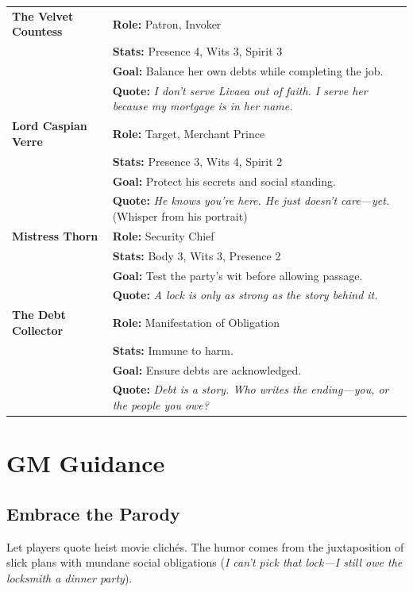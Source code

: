 \documentclass[12pt]{book}
\begin{document}
\begin{longtable}{p{} p{}}
\toprule
\textbf{The Velvet Countess} & \textbf{Role:} Patron, Invoker \\
& \textbf{Stats:} Presence 4, Wits 3, Spirit 3 \\
& \textbf{Goal:} Balance her own debts while completing the job. \\
& \textbf{Quote:} \textit{I don't serve Livaea out of faith. I serve her because my mortgage is in her name.} \\
\midrule
\textbf{Lord Caspian Verre} & \textbf{Role:} Target, Merchant Prince \\
& \textbf{Stats:} Presence 3, Wits 4, Spirit 2 \\
& \textbf{Goal:} Protect his secrets and social standing. \\
& \textbf{Quote:} \textit{He knows you're here. He just doesn't care---yet.} (Whisper from his portrait) \\
\midrule
\textbf{Mistress Thorn} & \textbf{Role:} Security Chief \\
& \textbf{Stats:} Body 3, Wits 3, Presence 2 \\
& \textbf{Goal:} Test the party's wit before allowing passage. \\
& \textbf{Quote:} \textit{A lock is only as strong as the story behind it.} \\
\midrule
\textbf{The Debt Collector} & \textbf{Role:} Manifestation of Obligation \\
& \textbf{Stats:} Immune to harm. \\
& \textbf{Goal:} Ensure debts are acknowledged. \\
& \textbf{Quote:} \textit{Debt is a story. Who writes the ending---you, or the people you owe?} \\
\bottomrule
\end{longtable}

\chapter{GM Guidance}

\section{Embrace the Parody}

Let players quote heist movie clichés. The humor comes from the juxtaposition of slick plans with mundane social obligations (\textit{I can't pick that lock---I still owe the locksmith a dinner party}).
\end{document}
